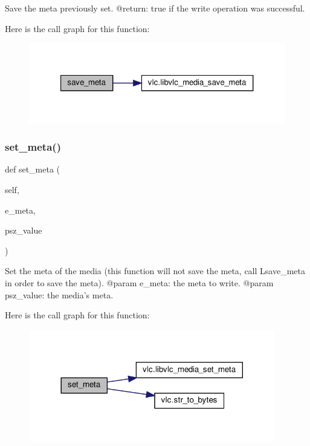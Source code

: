 \begin{DoxyVerb}Save the meta previously set.
@return: true if the write operation was successful.
\end{DoxyVerb}
 Here is the call graph for this function\+:
\nopagebreak
\begin{figure}[H]
\begin{center}
\leavevmode
\includegraphics[width=321pt]{classvlc_1_1_media_a24cb83ba2ba5d7060ba6541c5401b175_cgraph}
\end{center}
\end{figure}
\mbox{\label{classvlc_1_1_media_ab63d1b7198c0dd05a956a14bb884d462}} 
\subsubsection{\texorpdfstring{set\+\_\+meta()}{set\_meta()}}
{\footnotesize\ttfamily def set\+\_\+meta (\begin{DoxyParamCaption}\item[{}]{self,  }\item[{}]{e\+\_\+meta,  }\item[{}]{psz\+\_\+value }\end{DoxyParamCaption})}

\begin{DoxyVerb}Set the meta of the media (this function will not save the meta, call
L{save_meta} in order to save the meta).
@param e_meta: the meta to write.
@param psz_value: the media's meta.
\end{DoxyVerb}
 Here is the call graph for this function\+:
\nopagebreak
\begin{figure}[H]
\begin{center}
\leavevmode
\includegraphics[width=305pt]{classvlc_1_1_media_ab63d1b7198c0dd05a956a14bb884d462_cgraph}
\end{center}
\end{figure}
\mbox{\label{classvlc_1_1_media_a58fa1fb63b70cc0b8efe7a5633afbc74}} 
